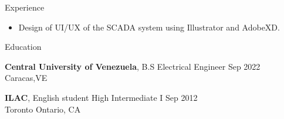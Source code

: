 \documentclass{resume} %
\begin{document}
\begin{rSection}{Experience}
\begin{itemize}
        \item Design of UI/UX of the SCADA system using Illustrator and AdobeXD.

    \end{itemize}


\end{rSection}




\begin{rSection}{Education} %

    \textbf{Central University of Venezuela}, B.S Electrical Engineer \hfill {Sep 2022} \\ \hfill{Caracas,VE}

    \textbf{ILAC}, English student High Intermediate I \hfill {Sep 2012} \\ \hfill{Toronto Ontario, CA}

\end{rSection}
\end{document}
